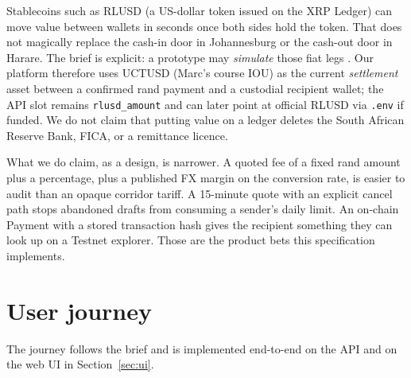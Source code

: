 \documentclass[11pt]{article}
\begin{document}
Stablecoins such as RLUSD (a US-dollar token issued on the XRP Ledger) can move value between wallets in seconds once both sides hold the token. That does not magically replace the cash-in door in Johannesburg or the cash-out door in Harare. The brief is explicit: a prototype may \emph{simulate} those fiat legs \citep{UCTBrief2026}. Our platform therefore uses UCTUSD (Marc's course IOU) as the current \emph{settlement} asset between a confirmed rand payment and a custodial recipient wallet; the API slot remains \texttt{rlusd\_amount} and can later point at official RLUSD via \texttt{.env} if funded. We do not claim that putting value on a ledger deletes the South African Reserve Bank, FICA, or a remittance licence.

What we do claim, as a design, is narrower. A quoted fee of a fixed rand amount plus a percentage, plus a published FX margin on the conversion rate, is easier to audit than an opaque corridor tariff. A 15-minute quote with an explicit cancel path stops abandoned drafts from consuming a sender's daily limit. An on-chain Payment with a stored transaction hash gives the recipient something they can look up on a Testnet explorer. Those are the product bets this specification implements.

\section{User journey}
The journey follows the brief \citep{UCTBrief2026} and is implemented end-to-end on the API and on the web UI in Section~\ref{sec:ui}.
\end{document}
